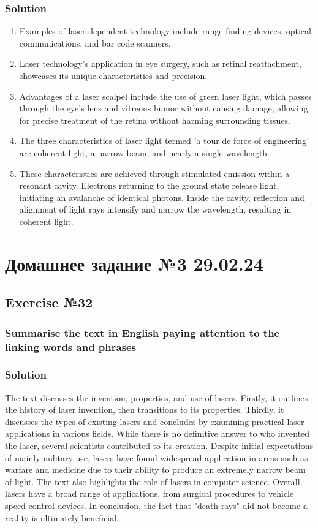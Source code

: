 \subsection*{Solution}
\begin{enumerate}
      \item Examples of laser-dependent technology include range finding devices, optical communications, and bar code scanners.
      \item Laser technology's application in eye surgery, such as retinal reattachment, showcases its unique characteristics and precision.
      \item Advantages of a laser scalpel include the use of green laser light, which passes through the eye's lens and vitreous humor without causing damage, allowing for precise treatment of the retina without harming surrounding tissues.
      \item The three characteristics of laser light termed 'a tour de force of engineering' are coherent light, a narrow beam, and nearly a single wavelength.
      \item These characteristics are achieved through stimulated emission within a resonant cavity. Electrons returning to the ground state release light, initiating an avalanche of identical photons. Inside the cavity, reflection and alignment of light rays intensify and narrow the wavelength, resulting in coherent light.
\end{enumerate}

\chapter{Домашнее задание №3 29.02.24}

\section*{Exercise №32}
\subsection*{Summarise the text in English paying attention to the linking words and
      phrases}

\subsection*{Solution}
The text discusses the invention, properties, and use of lasers. Firstly, it outlines
the history of laser invention, then transitions to its properties. Thirdly, it
discusses the types of existing lasers and concludes by examining practical laser
applications in various fields. While there is no definitive answer to who invented
the laser, several scientists contributed to its creation. Despite initial expectations
of mainly military use, lasers have found widespread application in areas such as
warfare and medicine due to their ability to produce an extremely narrow beam of
light. The text also highlights the role of lasers in computer science. Overall,
lasers have a broad range of applications, from surgical procedures to vehicle speed
control devices. In conclusion, the fact that "death rays" did not become a reality
is ultimately beneficial.

